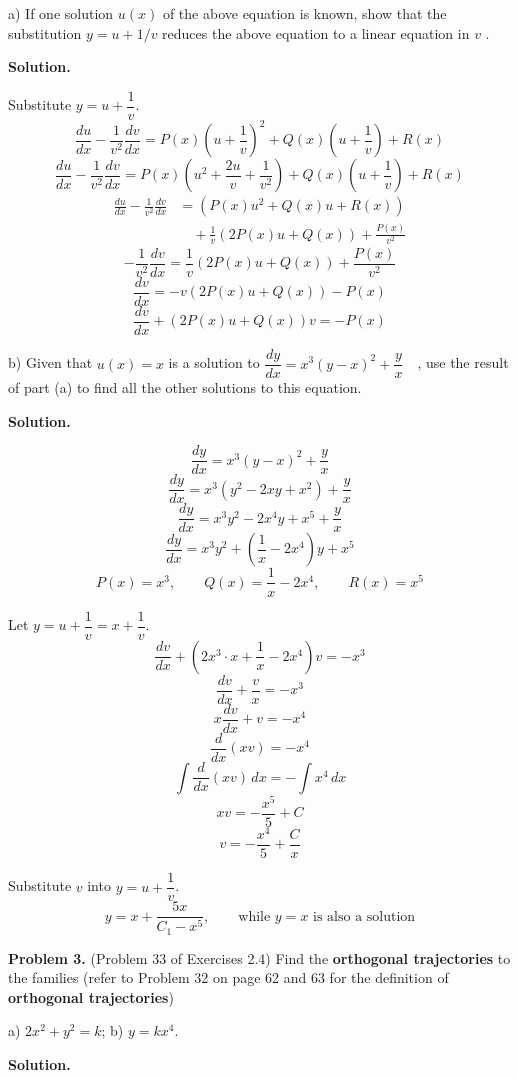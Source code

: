 \documentclass[11pt,a4paper]{article}
\begin{document}
a) If one solution $u(x)$ of the above equation is known, show that the substitution $y=u+1/v$ reduces the above equation to a linear equation in $v$ .
\par\medskip
\noindent\textbf{Solution.}\par
\medskip
Substitute \(y=u+\dfrac1v\).
\[
\frac{du}{dx}-\frac1{v^2}\frac{dv}{dx}
=P(x)\left(u+\frac1v\right)^2
+Q(x)\left(u+\frac1v\right)+R(x)
\]
\[
\frac{du}{dx}-\frac1{v^2}\frac{dv}{dx}
=P(x)\left(u^2+\frac{2u}{v}+\frac1{v^2}\right)
+Q(x)\left(u+\frac1v\right)+R(x)
\]
\[
\begin{aligned}
\frac{du}{dx}-\frac1{v^2}\frac{dv}{dx}
&=\left(P(x)u^2+Q(x)u+R(x)\right)\\
&\quad+\frac1v\left(2P(x)u+Q(x)\right)
+\frac{P(x)}{v^2}
\end{aligned}
\]
\[
-\frac1{v^2}\frac{dv}{dx}
=\frac1v\left(2P(x)u+Q(x)\right)
+\frac{P(x)}{v^2}
\]
\[
\frac{dv}{dx}
=-v\left(2P(x)u+Q(x)\right)-P(x)
\]
\[
\frac{dv}{dx}+\left(2P(x)u+Q(x)\right)v=-P(x)
\]

\medskip
b) Given that $u(x)=x$ is a solution to $\dfrac {dy}{dx}=x^3(y-x)^2+\dfrac {y}{x} \quad$,
use the result of part (a) to find all the other solutions to this equation.
\medskip
\par\medskip
\noindent\textbf{Solution.}\par
\medskip
\[
\frac{dy}{dx}=x^3(y-x)^2+\frac yx
\]
\[
\frac{dy}{dx}=x^3(y^2-2xy+x^2)+\frac yx
\]
\[
\frac{dy}{dx}=x^3y^2-2x^4y+x^5+\frac yx
\]
\[
\frac{dy}{dx}
=x^3y^2+\left(\frac1x-2x^4\right)y+x^5
\]
\[
P(x)=x^3,\qquad
Q(x)=\frac1x-2x^4,\qquad
R(x)=x^5
\]

Let \(y=u+\dfrac1v=x+\dfrac1v\).
\[
\frac{dv}{dx}
+\left(2x^3\cdot x+\frac1x-2x^4\right)v=-x^3
\]
\[
\frac{dv}{dx}+\frac vx=-x^3
\]
\[
x\frac{dv}{dx}+v=-x^4
\]
\[
\frac{d}{dx}(xv)=-x^4
\]
\[
\int\frac{d}{dx}(xv)\,dx=-\int x^4\,dx
\]
\[
xv=-\frac{x^5}{5}+C
\]
\[
v=-\frac{x^4}{5}+\frac Cx
\]

Substitute \(v\) into \(y=u+\dfrac1v\).
\[
y=x+\frac{5x}{C_1-x^5},
\qquad \text{while }y=x\text{ is also a solution}
\]

\bigskip
\noindent
{\bf Problem 3.} (Problem 33 of Exercises 2.4)
Find the {\bf orthogonal trajectories} to the families (refer to Problem 32 on page 62 and 63 for the definition of  {\bf orthogonal trajectories})

a)  $2x^2 + y^2 = k$; \;\;\;\; b) $y = k x^4$.
\par\medskip
\noindent\textbf{Solution.}\par
\medskip
\end{document}
